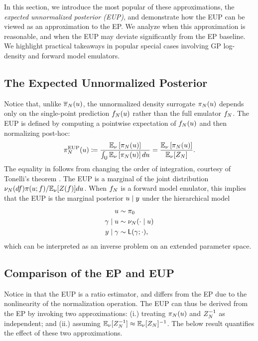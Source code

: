 \documentclass[12pt]{article}
\begin{document}
In this section, we introduce the most popular of these approximations, the 
\textit{expected unnormalized posterior (EUP)}, and demonstrate 
how the EUP can be viewed as an approximation to the EP.
We analyze when this approximation is reasonable, and when the EUP may 
deviate significantly from the EP baseline. We highlight practical takeaways 
in popular special cases involving GP log-density and forward model emulators.

\subsection{The Expected Unnormalized Posterior} \label{sec:eup}
Notice that, unlike $\overline{\pi}_{N}(u)$, the unnormalized density surrogate
$\pi_{N}(u)$ depends only on the single-point prediction $f_{N}(u)$
rather than the full emulator $f_{N}$. The EUP is defined by computing
a pointwise expectation of $f_{N}(u)$ and then normalizing post-hoc:
\begin{equation}
\pi_{N}^{\mathrm{EUP}}(u) \coloneqq 
\frac{\mathbb{E}_{\nu_{}} \left[\pi_{N}(u) \right]}{\int_{\mathsf{U}} \mathbb{E}_{\nu_{}}\left[\pi_{N}(u) \right] du}
= \frac{\mathbb{E}_{\nu_{}}\left[\pi_{N}(u) \right]}{\mathbb{E}_{\nu_{}}[Z_{N}]}. \label{eq:post-approx-EL} 
\end{equation}
The equality in  follows from
changing the order of integration, courtesy of Tonelli's theorem \citep{StuartTeck1}. The EUP
is a marginal of the joint distribution 
$\nu_{N}(df) \pi(u; f) / \mathbb{E}_{\nu_{}}[Z(f)] du$. 
When $f_{N}$ is a forward model emulator, this implies that the EUP is the 
marginal posterior $u \mid y$ under the hierarchical model 
\begin{align}
u &\sim \pi_0 \label{eq:el-prob-model} \\
\gamma \mid u &\sim \nu_{N}(\cdot \mid u) \nonumber \\
y \mid \gamma &\sim \mathsf{L}(\gamma; \cdot), \nonumber
\end{align}
which can be interpreted as an inverse problem on an extended parameter space.

\subsection{Comparison of the EP and EUP}
Notice in  that the EUP is a ratio estimator, and differs from 
the EP due to the nonlinearity of the normalization operation. The EUP can thus 
be derived from the EP by invoking two approximations: 
(i.) treating $\pi_{N}(u)$ and $Z_{N}^{-1}$ as independent; and 
(ii.) assuming $\mathbb{E}_{\nu_{}}[Z_{N}^{-1}] \approx \mathbb{E}_{\nu_{}}[Z_{N}]^{-1}$.
The below result quantifies the effect of these two approximations.
\end{document}
